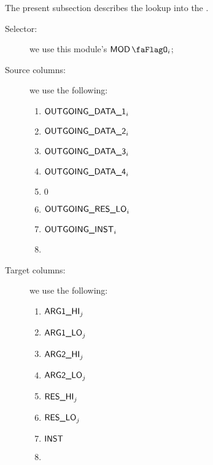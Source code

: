 The present subsection describes the lookup into the \modMod{}.
\begin{description}
	\item[Selector:] we use this module's $\modFlag{}_{i}$;
	\item[Source columns:] we use the following:
		\begin{multicols}{2}
			\begin{enumerate}
				\item $\textsf{OUTGOING\_DATA\_1}_{i}$
				\item $\textsf{OUTGOING\_DATA\_2}_{i}$
				\item $\textsf{OUTGOING\_DATA\_3}_{i}$
				\item $\textsf{OUTGOING\_DATA\_4}_{i}$
				\item $0$
				\item $\textsf{OUTGOING\_RES\_LO}_{i}$
				\item $\textsf{OUTGOING\_INST}_{i}$
				\item[\vspace{\fill}]
			\end{enumerate}
		\end{multicols}
	\item[Target columns:] we use the following:
		\begin{multicols}{2}
			\begin{enumerate}
				\item $\textsf{ARG}\textsf{1}\textsf{\_HI}_{j}$
				\item $\textsf{ARG}\textsf{1}\textsf{\_LO}_{j}$
				\item $\textsf{ARG}\textsf{2}\textsf{\_HI}_{j}$
				\item $\textsf{ARG}\textsf{2}\textsf{\_LO}_{j}$
				\item $\textsf{RES}\textsf{\_HI}_{j}$
				\item $\textsf{RES}\textsf{\_LO}_{j}$
				\item $\textsf{INST}$
				\item[\vspace{\fill}]
			\end{enumerate}
		\end{multicols}
\end{description}

